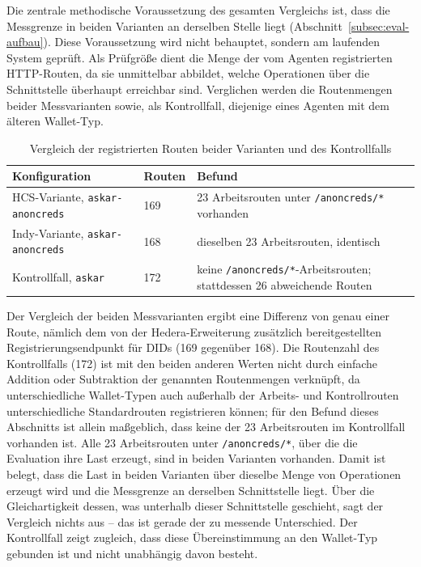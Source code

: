 Die zentrale methodische Voraussetzung des gesamten Vergleichs ist, dass die Messgrenze in beiden Varianten an derselben Stelle liegt (Abschnitt~\ref{subsec:eval-aufbau}). Diese Voraussetzung wird nicht behauptet, sondern am laufenden System geprüft. Als Prüfgröße dient die Menge der vom Agenten registrierten HTTP-Routen, da sie unmittelbar abbildet, welche Operationen über die Schnittstelle überhaupt erreichbar sind. Verglichen werden die Routenmengen beider Messvarianten sowie, als Kontrollfall, diejenige eines Agenten mit dem älteren Wallet-Typ.

\begin{table}[htbp]
\renewcommand{\arraystretch}{1.3}
\footnotesize
  \centering
  \caption{Vergleich der registrierten Routen beider Varianten und des Kontrollfalls}
  \label{tab:impl-routen}
  \begin{tabular}{p{} p{} p{}}
    \toprule
    \textbf{Konfiguration} & \textbf{Routen} & \textbf{Befund} \\
    \midrule
    HCS-Variante, \texttt{askar-anoncreds} & 169 & 23 Arbeitsrouten unter \texttt{/anoncreds/*} vorhanden \\
    Indy-Variante, \texttt{askar-anoncreds} & 168 & dieselben 23 Arbeitsrouten, identisch \\
    Kontrollfall, \texttt{askar} & 172 & keine \texttt{/anoncreds/*}-Arbeitsrouten; stattdessen 26 abweichende Routen \\
    \bottomrule
  \end{tabular}
\end{table}

Der Vergleich der beiden Messvarianten ergibt eine Differenz von genau einer Route, nämlich dem von der Hedera-Erweiterung zusätzlich bereitgestellten Registrierungsendpunkt für DIDs (169 gegenüber 168). Die Routenzahl des Kontrollfalls (172) ist mit den beiden anderen Werten nicht durch einfache Addition oder Subtraktion der genannten Routenmengen verknüpft, da unterschiedliche Wallet-Typen auch außerhalb der Arbeits- und Kontrollrouten unterschiedliche Standardrouten registrieren können; für den Befund dieses Abschnitts ist allein maßgeblich, dass keine der 23 Arbeitsrouten im Kontrollfall vorhanden ist. Alle 23 Arbeitsrouten unter \texttt{/anoncreds/*}, über die die Evaluation ihre Last erzeugt, sind in beiden Varianten vorhanden. Damit ist belegt, dass die Last in beiden Varianten über dieselbe Menge von Operationen erzeugt wird und die Messgrenze an derselben Schnittstelle liegt. Über die Gleichartigkeit dessen, was unterhalb dieser Schnittstelle geschieht, sagt der Vergleich nichts aus -- das ist gerade der zu messende Unterschied. Der Kontrollfall zeigt zugleich, dass diese Übereinstimmung an den Wallet-Typ gebunden ist und nicht unabhängig davon besteht.

